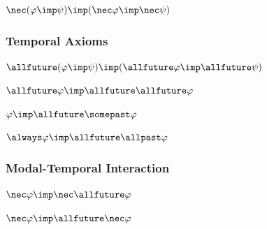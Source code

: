 \documentclass[../BimodalReference.tex]{subfiles}
\begin{document}
\begin{axiom}
$\nec(\varphi \imp \psi) \imp (\nec\varphi \imp \nec\psi)$
\end{axiom}

\subsubsection{Temporal Axioms}

\begin{axiom}
$\allfuture(\varphi \imp \psi) \imp (\allfuture\varphi \imp \allfuture\psi)$
\end{axiom}

\begin{axiom}[T4 - Temporal 4]
$\allfuture\varphi \imp \allfuture\allfuture\varphi$
\end{axiom}

\begin{axiom}[TA - Temporal A]
$\varphi \imp \allfuture\somepast\varphi$
\end{axiom}

\begin{axiom}[TL - Temporal L]
$\always\varphi \imp \allfuture\allpast\varphi$
\end{axiom}

\subsubsection{Modal-Temporal Interaction}

\begin{axiom}
$\nec\varphi \imp \nec\allfuture\varphi$
\end{axiom}

\begin{axiom}
$\nec\varphi \imp \allfuture\nec\varphi$
\end{axiom}
\end{document}
